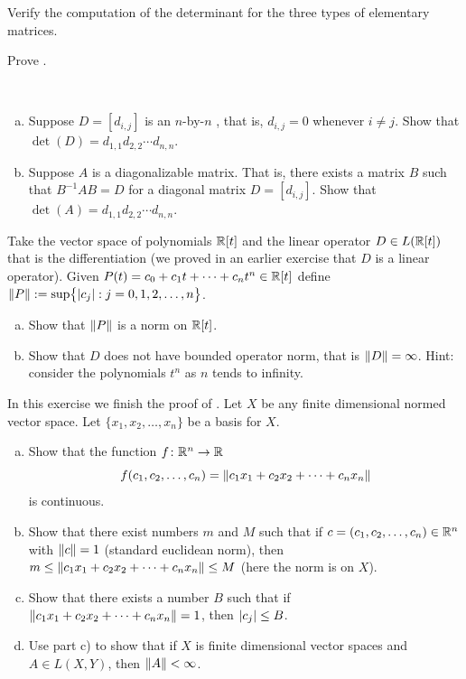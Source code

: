 \begin{exercise}
Verify the computation of the determinant for the three types of 
elementary matrices.
\end{exercise}

\begin{exercise}
Prove .
\end{exercise}

\begin{exercise}
{\ }
\begin{enumerate}[a)]
\item
Suppose $D = [d_{i,j}]$ is an $n$-by-$n$ \emph{}, that is, $d_{i,j} = 0$ whenever $i
\not= j$.  Show that $\det(D) = d_{1,1}d_{2,2} \cdots d_{n,n}$.
\item
Suppose $A$ is a diagonalizable matrix.  That is, there exists a matrix
$B$ such that $B^{-1}AB = D$ for a diagonal matrix $D = [d_{i,j}]$.  Show
that $\det(A) = d_{1,1}d_{2,2} \cdots d_{n,n}$.
\end{enumerate}
\end{exercise}

\begin{exercise}
Take the vector space of polynomials ${\mathbb{R}}[t]$ and the linear operator $D \in
L({\mathbb{R}}[t])$ that is
the differentiation (we proved in an earlier exercise that $D$ is a linear
operator).  Given $P(t) = c_0 + c_1 t + \cdots + c_n
t^n \in {\mathbb{R}}[t]$ define $\lVert {P} \rVert := \sup \bigl\{ \lvert {c_j} \rvert : j = 0,1,2,\ldots,n \bigr\}$.
\begin{enumerate}[a)]
\item
Show that $\lVert {P} \rVert$ is a norm on ${\mathbb{R}}[t]$.
\item
Show that $D$ does not have bounded operator norm, that is $\lVert {D} \rVert =
\infty$.  Hint: consider the polynomials $t^n$ as $n$ tends to infinity.
\end{enumerate}
\end{exercise}

\begin{exercise}
In this exercise we finish the proof of .
Let $X$ be any finite dimensional normed vector space.
Let $\{ x_1,x_2,\ldots,x_n \}$ be a basis for $X$.
\begin{enumerate}[a)]
\item
Show that the function $f \colon {\mathbb{R}}^n \to {\mathbb{R}}$
\begin{equation*}
f(c_1,c_2,\ldots,c_n) = 
\lVert {c_1 x_1 + c_2 x_2 + \cdots + c_n x_n} \rVert
\end{equation*}
is continuous.
\item
Show that there exist numbers $m$ and $M$ such
that if $c = (c_1,c_2,\ldots,c_n) \in {\mathbb{R}}^n$ with
$\lVert {c} \rVert = 1$ (standard euclidean norm), then 
$m \leq \lVert {c_1 x_1 + c_2 x_2 + \cdots + c_n x_n} \rVert \leq M$ (here the
norm is on $X$).
\item
Show that there exists a number $B$ such that if
$\lVert {c_1 x_1 + c_2 x_2 + \cdots + c_n x_n} \rVert=1$,
then $\lvert {c_j} \rvert \leq B$.
\item
Use part c) to show that if $X$ is finite dimensional vector 
spaces and $A \in L(X,Y)$, then $\lVert {A} \rVert < \infty$.
\end{enumerate}
\end{exercise}

